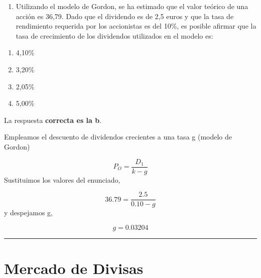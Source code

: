 \documentclass[
  letterpaper,
  DIV=11,
  numbers=noendperiod]{scrreprt}
\providecommand{\tightlist}{%
  \setlength{\itemsep}{0pt}\setlength{\parskip}{0pt}}\usepackage{longtable,booktabs,array}
\begin{document}
\begin{enumerate}
\def\labelenumi{\arabic{enumi}.}
\setcounter{enumi}{90}
\tightlist
\item
  Utilizando el modelo de Gordon, se ha estimado que el valor teórico de
  una acción es 36,79. Dado que el dividendo es de 2,5 euros y que la
  tasa de rendimiento requerida por los accionistas es del 10\%, es
  posible afirmar que la tasa de crecimiento de los dividendos
  utilizados en el modelo es:
\end{enumerate}

\begin{enumerate}
\def\labelenumi{\alph{enumi}.}
\tightlist
\item
  4,10\%
\item
  3,20\%
\item
  2,05\%
\item
  5,00\%
\end{enumerate}

\begin{tcolorbox}[enhanced jigsaw, left=2mm, opacityback=0, colback=white, breakable, arc=.35mm, bottomrule=.15mm, rightrule=.15mm, toprule=.15mm, leftrule=.75mm, colframe=quarto-callout-tip-color-frame]
\begin{minipage}[t]{5.5mm}
\textcolor{quarto-callout-tip-color}{\faLightbulb}
\end{minipage}%
\begin{minipage}[t]{\textwidth - 5.5mm}

La respuesta \textbf{correcta es la b}.

Empleamos el descuento de dividendos crecientes a una tasa g (modelo de
Gordon)

\[P_O=\frac{D_1}{k-g}\] Sustituimos los valores del enunciado,

\[36.79=\frac{2.5}{0.10-g}\] y despejamos g,

\[g=0.03204\]

\end{minipage}%
\end{tcolorbox}

\begin{center}\rule{0.5\linewidth}{0.5pt}\end{center}

\hypertarget{mercado-de-divisas}{%
\section*{Mercado de Divisas}\label{mercado-de-divisas}}
\end{document}
